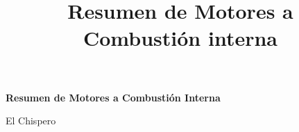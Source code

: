 \documentclass[twocolumn,11pt]{article}
\begin{document}
\title{Resumen de Motores a Combustión interna}


\onecolumn
\centering 
{\bf \huge Resumen de Motores a Combustión Interna \par}
\vspace{.2cm}
{\sc \large El Chispero\par }
\vspace{.4cm}\par
\tableofcontents

\twocolumn{


}
\end{document}
